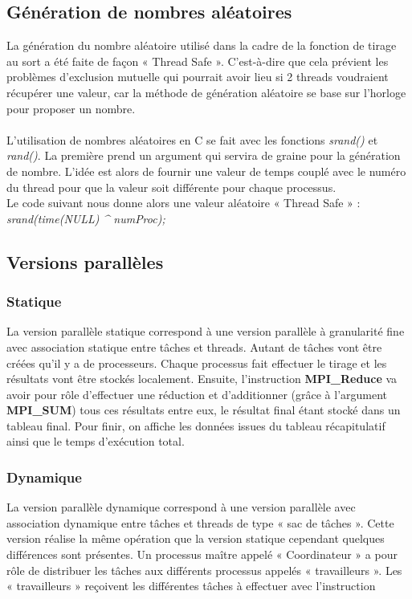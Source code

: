 \documentclass[a4paper,12pt]{article}
\begin{document}
\subsection{Génération de nombres aléatoires}
La génération du nombre aléatoire utilisé dans la cadre de la fonction de tirage au sort a été faite de façon « Thread Safe ». C'est-à-dire que cela prévient les problèmes d'exclusion mutuelle qui pourrait avoir lieu si 2 threads voudraient récupérer une valeur, car la méthode de génération aléatoire se base sur l'horloge pour proposer un nombre.\\\\
L'utilisation de nombres aléatoires en C se fait avec les fonctions \textit{srand()} et \textit{rand()}. La première prend un argument qui servira de graine pour la génération de nombre. L'idée est alors de fournir une valeur de temps couplé avec le numéro du thread pour que la valeur soit différente pour chaque processus. \\
Le code suivant nous donne alors une valeur aléatoire « Thread Safe » : \\
\textit{srand(time(NULL) {\large \textasciicircum}  numProc);}


\subsection{Versions parallèles}

\subsubsection{Statique}
La version parallèle statique correspond à une version parallèle à granularité fine avec association statique entre tâches et threads. Autant de tâches vont être créées qu'il y a de processeurs. Chaque processus fait effectuer le tirage et les résultats vont être stockés localement. Ensuite, l'instruction \textbf{MPI\_Reduce} va avoir pour rôle d'effectuer une réduction et d'additionner (grâce à l'argument \textbf{MPI\_SUM}) tous ces résultats entre eux, le résultat final étant stocké dans un tableau final. Pour finir, on affiche les données issues du tableau récapitulatif ainsi que le temps d'exécution total. 

\subsubsection{Dynamique}
La version parallèle dynamique correspond à une version parallèle avec association dynamique entre tâches et threads de type « sac de tâches ». Cette version réalise la même opération que la version statique cependant quelques différences sont présentes. Un processus maître appelé « Coordinateur » a pour rôle de distribuer les tâches aux différents processus appelés « travailleurs ». Les « travailleurs » reçoivent les différentes tâches à effectuer avec l'instruction 
\end{document}
